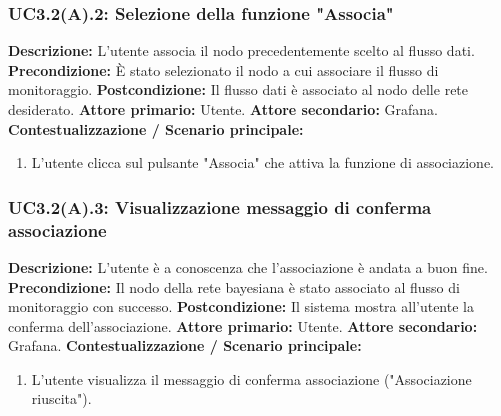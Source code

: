                 \subsubsection{UC3.2(A).2: Selezione della funzione "Associa"}
                    \textbf{Descrizione:} L’utente associa il nodo precedentemente scelto al flusso dati.
                    \newline
                    \textbf{Precondizione:}  È stato selezionato il nodo a cui associare il flusso di monitoraggio.
                    \newline
                    \textbf{Postcondizione:} Il flusso dati è associato al nodo delle rete desiderato.
                    \newline
                    \textbf{Attore primario:} Utente.
                    \newline
                    \textbf{Attore secondario:} Grafana.
                    \newline
                    \textbf{Contestualizzazione / Scenario principale:} \begin{enumerate}
                        \item L’utente clicca sul pulsante "Associa" che attiva la funzione di associazione.
                    \end{enumerate} 
                
	           
	            \subsubsection{UC3.2(A).3: Visualizzazione messaggio di conferma associazione}
	                \textbf{Descrizione:} L’utente è a conoscenza che l'associazione è andata a buon fine.
	                \newline
                    \textbf{Precondizione:} Il nodo della rete bayesiana è stato associato al flusso di monitoraggio con successo.
                    \newline
                    \textbf{Postcondizione:} Il sistema mostra all'utente la conferma dell'associazione.
                    \newline
                    \textbf{Attore primario:} Utente.
                    \newline
                    \textbf{Attore secondario:} Grafana.
                    \newline
                    \textbf{Contestualizzazione / Scenario principale:} \begin{enumerate}
                        \item L'utente visualizza il messaggio di conferma associazione ("Associazione riuscita").
                    \end{enumerate}
                    
